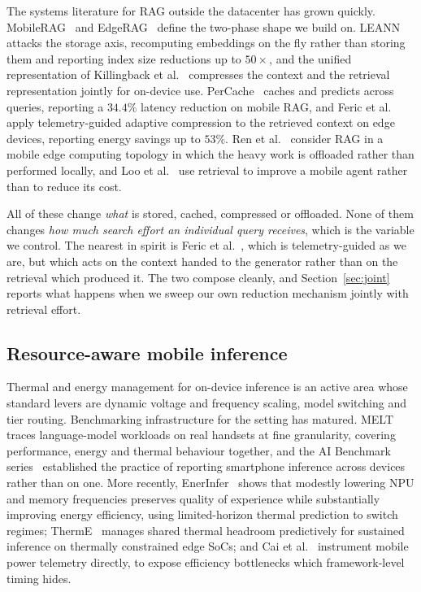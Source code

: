 \documentclass[journal]{IEEEtran}
\begin{document}
The systems literature for RAG outside the datacenter has grown quickly.
MobileRAG~\cite{park2025mobilerag} and EdgeRAG~\cite{seemakhupt2024edgerag}
define the two-phase shape we build on. LEANN~\cite{wang2025leann} attacks
the storage axis, recomputing embeddings on the fly rather than storing
them and reporting index size reductions up to $50\times$, and the unified
representation of Killingback et al.~\cite{killingback2026unified}
compresses the context and the retrieval representation jointly for
on-device use. PerCache~\cite{liu2026percache} caches and predicts across
queries, reporting a $34.4\%$ latency reduction on mobile RAG, and Feric et
al.~\cite{feric2026adaptivecompression} apply telemetry-guided adaptive
compression to the retrieved context on edge devices, reporting energy
savings up to $53\%$. Ren et al.~\cite{ren2024mec} consider RAG in a mobile
edge computing topology in which the heavy work is offloaded rather than
performed locally, and Loo et al.~\cite{loo2025mobileagent} use retrieval
to improve a mobile agent rather than to reduce its cost.

All of these change \emph{what} is stored, cached, compressed or offloaded.
None of them changes \emph{how much search effort an individual query
receives}, which is the variable we control. The nearest in spirit is Feric
et al.~\cite{feric2026adaptivecompression}, which is telemetry-guided as we
are, but which acts on the context handed to the generator rather than on
the retrieval which produced it. The two compose cleanly, and
Section~\ref{sec:joint} reports what happens when we sweep our own
reduction mechanism jointly with retrieval effort.

\subsection{Resource-aware mobile inference}

Thermal and energy management for on-device inference is an active area
whose standard levers are dynamic voltage and frequency scaling, model
switching and tier routing. Benchmarking infrastructure for the setting has
matured. MELT~\cite{laskaridis2024melt} traces language-model workloads on
real handsets at fine granularity, covering performance, energy and thermal
behaviour together, and the AI Benchmark series~\cite{ignatov2019aibench}
established the practice of reporting smartphone inference across devices
rather than on one. More recently, EnerInfer~\cite{zou2026enerinfer} shows
that modestly lowering NPU and memory frequencies preserves quality of
experience while substantially improving energy efficiency, using
limited-horizon thermal prediction to switch regimes;
ThermE~\cite{lu2026therme} manages shared thermal headroom predictively for
sustained inference on thermally constrained edge SoCs; and Cai et
al.~\cite{cai2026npuready} instrument mobile power telemetry directly, to
expose efficiency bottlenecks which framework-level timing hides.
\end{document}
